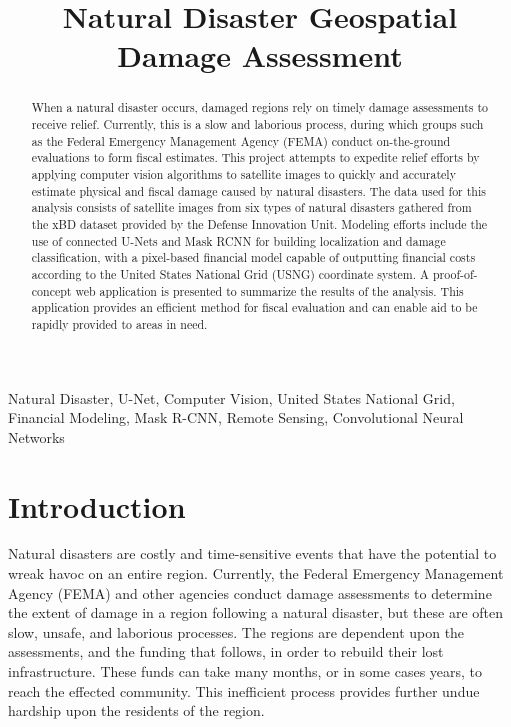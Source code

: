\documentclass[conference]{IEEEtran}
\begin{document}
\title{Natural Disaster Geospatial Damage Assessment\\
}

\author{

}

\maketitle

\begin{abstract}
When a natural disaster occurs, damaged regions rely on timely damage assessments to receive relief. Currently, this is a slow and laborious process, during which groups such as the Federal Emergency Management Agency (FEMA) conduct on-the-ground evaluations to form fiscal estimates. This project attempts to expedite relief efforts by applying computer vision algorithms to satellite images to quickly and accurately estimate physical and fiscal damage caused by natural disasters. The data used for this analysis consists of satellite images from six types of natural disasters gathered from the xBD dataset provided by the Defense Innovation Unit. Modeling efforts include the use of connected U-Nets and Mask RCNN for building localization and damage classification, with a pixel-based financial model capable of outputting financial costs according to the United States National Grid (USNG) coordinate system. A proof-of-concept web application is presented to summarize the results of the analysis. This application provides an efficient method for fiscal evaluation and can enable aid to be rapidly provided to areas in need.
\end{abstract}

\begin{IEEEkeywords}
Natural Disaster, U-Net, Computer Vision, United States National Grid, Financial Modeling, Mask R-CNN, Remote Sensing, Convolutional Neural Networks
\end{IEEEkeywords}

\section{Introduction}
Natural disasters are costly and time-sensitive events that have the potential to wreak havoc on an entire region. Currently, the Federal Emergency Management Agency (FEMA) and other agencies conduct damage assessments to determine the extent of damage in a region following a natural disaster, but these are often slow, unsafe, and laborious processes. The regions are dependent upon the assessments, and the funding that follows, in order to rebuild their lost infrastructure. These funds can take many months, or in some cases years, to reach the effected community. This inefficient process provides further undue hardship upon the residents of the region. 
\end{document}
